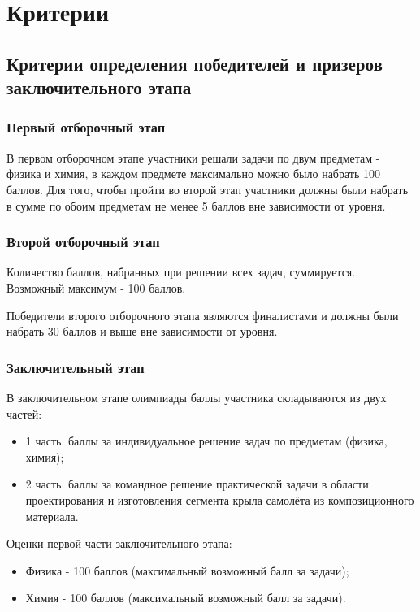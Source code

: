 \part{Критерии}

\chapter{Критерии определения победителей и призеров заключительного этапа}

\section{Первый отборочный этап}
 
В первом отборочном этапе участники решали задачи по двум предметам - физика и химия, в каждом предмете максимально можно было набрать 100 баллов. Для того, чтобы пройти во второй этап участники должны были набрать в сумме по обоим предметам не менее 5 баллов вне зависимости от уровня.

\section{Второй отборочный этап}

Количество баллов, набранных при решении всех задач, суммируется. Возможный максимум - 100 баллов.
 
Победители второго отборочного этапа являются финалистами и должны были набрать 30 баллов и выше вне зависимости от уровня.

\section{Заключительный этап}

В заключительном этапе олимпиады баллы участника складываются из двух частей:
\begin{itemize}
    \item 1 часть: баллы за индивидуальное решение задач по предметам (физика, химия);
    \item 2 часть: баллы за командное решение практической задачи в области проектирования и изготовления сегмента крыла самолёта из композиционного материала.
\end{itemize}

Оценки первой части заключительного этапа:
\begin{itemize}
    \item Физика - 100 баллов (максимальный возможный балл за задачи);
    \item Химия - 100 баллов (максимальный возможный балл за задачи).
\end{itemize}

